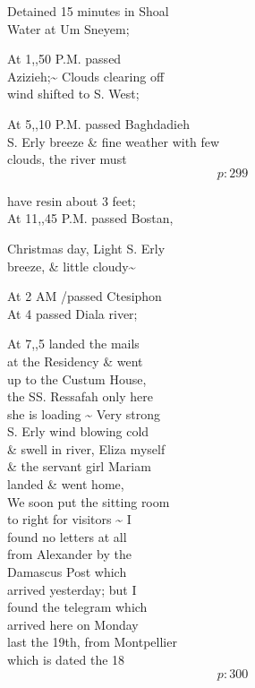 \documentclass{report}
\begin{document}
	\par{
 	Detained 15 minutes in Shoal\ \\Water at Um Sneyem;\ \\
	}

	\par{
 	At 1,,50 P.M. passed\ \\Azizieh;\~{} Clouds clearing off\ \\wind shifted to S. West;\ \\
	}

	\par{
 	At 5,,10 P.M. passed Baghdadieh\ \\S. Erly breeze \& fine weather with few\ \\clouds, the river must\ \\
  \[p: 299 \]

	}



	\par{
 	have resin about 3 feet;\ \\At 11,,45 P.M. passed Bostan,\ \\
	}

	\par{
 	Christmas day, Light S. Erly\ \\breeze, \& little cloudy\~{}\ \\
	}

	\par{
 	At 2 AM /passed Ctesiphon\ \\At 4 passed Diala river;\ \\
	}

	\par{
 	At 7,,5 landed the mails\ \\at the Residency \& went\ \\up to the Custum House,\ \\the SS. Ressafah only here\ \\she is loading \~{} Very strong\ \\S. Erly wind blowing cold\ \\\& swell in river, Eliza myself\ \\\& the servant girl Mariam\ \\landed \& went home,\ \\We soon put the sitting room\ \\to right for visitors \~{} I\ \\found no letters at all\ \\from Alexander by the\ \\Damascus Post which\ \\arrived yesterday; but I\ \\found the telegram which\ \\arrived here on Monday\ \\last the 19th, from Montpellier\ \\which is dated the 18\ \\
  \[p: 300 \]

	}
\end{document}
